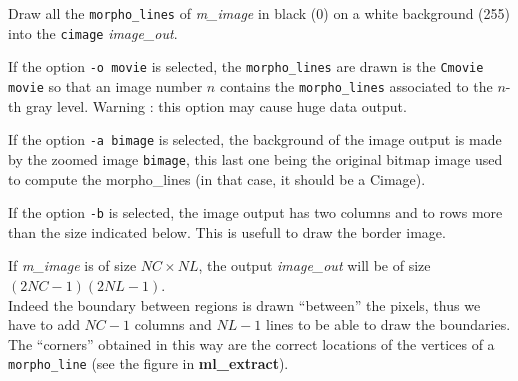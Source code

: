 Draw all the {\tt morpho\_lines} of {\em m\_image} in
black (0) on a white background (255) into  the
{\tt cimage} {\em image\_out}.

If the option \verb+-o movie+ is selected, the {\tt morpho\_lines}
are drawn is the {\tt Cmovie} \verb+movie+ so that an image number
$n$ contains the {\tt morpho\_lines} associated to the $n$-th 
gray level. Warning : this option may cause huge data output.

If the option \verb+-a bimage+ is selected, the background of the
image output is made by the zoomed image \verb+bimage+, this last
one being the original bitmap image used to compute the morpho\_lines
(in that case, it should be a Cimage).

If the option \verb+-b+ is selected, the image output has two columns
and to rows more than the size indicated below. This is usefull to
draw the border image. 

\smallskip

If {\em m\_image} is of size $NC\times NL$, 
the output {\em image\_out} will be of size $(2NC-1)(2NL-1)$.\\
Indeed the boundary between regions is drawn ``between'' the pixels,
thus we have to add $NC-1$ columns and $NL-1$ lines to be able
to draw the boundaries. \\
The ``corners'' obtained in this way are the correct locations
of the vertices of a {\tt morpho\_line} (see the figure in
{\bf ml\_extract}).